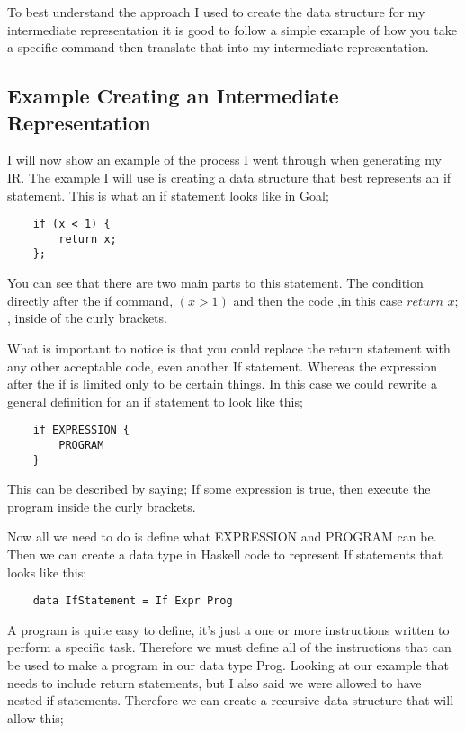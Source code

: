 To best understand the approach I used to create the data structure for my intermediate representation it is good to follow a simple example of how you take a specific command then translate that into my intermediate representation.

\subsection{Example Creating an Intermediate Representation}

I will now show an example of the process I went through when generating my IR. The example I will use is creating a data structure that best represents an if statement. This is what an if statement looks like in Goal;

\begin{lstlisting}
	if (x < 1) {
		return x;
	};
\end{lstlisting}

You can see that there are two main parts to this statement. The condition directly after the if command,  $(x > 1)$  and then the code ,in this case $return$ $x;$, inside of the curly brackets. 

What is important to notice is that you could replace the return statement with any other acceptable code, even another If statement. Whereas the expression after the if is limited only to be certain things. In this case we could rewrite a general definition for an if statement to look like this;

\begin{lstlisting}
	if EXPRESSION {
		PROGRAM 
	}
\end{lstlisting}

This can be described by saying; If some expression is true, then execute the program inside the curly brackets.
 
Now all we need to do is define what  EXPRESSION and PROGRAM can be. Then we can create a data type in Haskell code to represent If statements that looks like this;

\begin{lstlisting}
	data IfStatement = If Expr Prog 
\end{lstlisting}

A program is quite easy to define, it's just a one or more instructions written to perform a specific task\footnotemark[2]. Therefore we must define all of the instructions that can be used to make a program in our data type Prog. Looking at our example that needs to include return statements, but I also said we were allowed to have nested if statements. Therefore we can create a recursive data structure that will allow this;

